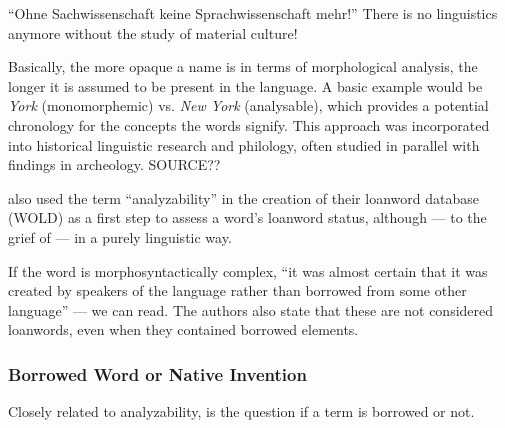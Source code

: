 ``Ohne Sachwissenschaft keine Sprachwissenschaft mehr!'' There is no linguistics anymore without the study of material culture!

Basically, the more opaque a name is in terms of morphological analysis, the longer it is assumed to be present in the language. A basic example would be \textit{York} (monomorphemic) vs. \textit{New York} (analysable), which provides a potential chronology for the concepts the words signify. This approach was incorporated into historical linguistic research and philology, often studied in parallel with findings in archeology. SOURCE??

\textcite[12]{haspelmath_loanwords_2009} also used the term ``analyzability'' in the creation of their loanword database (\gls{WOLD}) as a first step to assess a word's loanword status, although --- to the grief of --- in a purely linguistic way. 


If the word is morphosyntactically complex, ``it was almost certain that it was created by speakers of the language rather than borrowed from some other language'' --- we can read. The authors also state that these are not considered loanwords, even when they contained borrowed elements. 

\subsubsection{Borrowed Word or Native Invention}

Closely related to analyzability, is the question if a term is borrowed or not.


